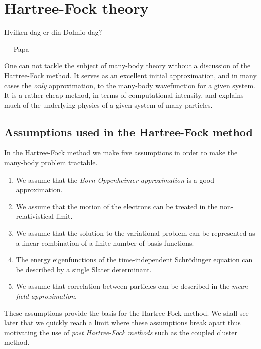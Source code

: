 \chapter{Hartree-Fock theory}
    \epigraph{Hvilken dag er din Dolmio dag?}{--- Papa}

    One can not tackle the subject of many-body theory without a discussion of
    the Hartree-Fock method. It serves as an excellent initial approximation,
    and in many cases the \emph{only} approximation, to the many-body
    wavefunction for a given system. It is a rather cheap method, in terms of
    computational intensity, and explains much of the underlying physics of a
    given system of many particles.

    \section{Assumptions used in the Hartree-Fock method}
        In the Hartree-Fock method we make five assumptions in order to make the
        many-body problem tractable.
        \begin{enumerate}
            \item We assume that the \emph{Born-Oppenheimer approximation} is a
                good approximation.
            \item We assume that the motion of the electrons can be treated in
                the non-relativistical limit.
            \item We assume that the solution to the variational problem can be
                represented as a linear combination of a finite number of basis
                functions.
            \item The energy eigenfunctions of the time-independent Schrödinger
                equation can be described by a single Slater determinant.
            \item We assume that correlation between particles can be described
                in the \emph{mean-field approximation}.
        \end{enumerate}
        These assumptions provide the basis for the Hartree-Fock method. We
        shall see later that we quickly reach a limit where these assumptions
        break apart thus motivating the use of \emph{post Hartree-Fock methods}
        such as the coupled cluster method.
